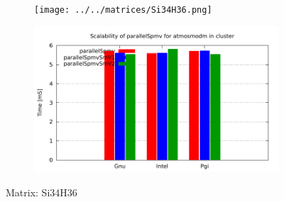 \begin{figure} [ht!]
    \centering
    \captionsetup{justification=centering, singlelinecheck=false}
    \begin{subfigure}{.65\textwidth}
      \centering
      \hspace*{-3.5cm} 
      \texttt{[image: ../../matrices/Si34H36.png]}
      \label{fig:Si34H36_matrix}
    \end{subfigure}%
    \begin{subfigure}{.65\textwidth}
      \centering
      \hspace*{-6.0cm} 
      \includegraphics[page=7, width=0.95\linewidth]{../plots/myCluster_4-2.pdf}
      \label{fig:Si34H36_performance}
    \end{subfigure}
\caption{Matrix: Si34H36}
\label{fig:Si34H36}
\end{figure}

